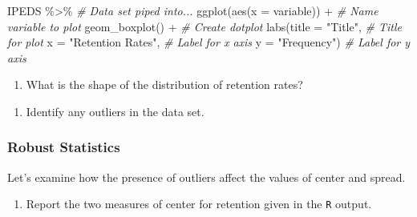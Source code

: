 \documentclass[
]{report}
\newenvironment{Shaded}{\begin{snugshade}}{\end{snugshade}}
\newcommand{\AttributeTok}[1]{\textcolor[rgb]{0.77,0.63,0.00}{#1}}
\newcommand{\CommentTok}[1]{\textcolor[rgb]{0.56,0.35,0.01}{\textit{#1}}}
\newcommand{\FunctionTok}[1]{\textcolor[rgb]{0.00,0.00,0.00}{#1}}
\newcommand{\NormalTok}[1]{#1}
\newcommand{\SpecialCharTok}[1]{\textcolor[rgb]{0.00,0.00,0.00}{#1}}
\newcommand{\StringTok}[1]{\textcolor[rgb]{0.31,0.60,0.02}{#1}}
\providecommand{\tightlist}{%
  \setlength{\itemsep}{0pt}\setlength{\parskip}{0pt}}
\begin{document}
\begin{Shaded}
\begin{Highlighting}[]
\NormalTok{IPEDS }\SpecialCharTok{\%\textgreater{}\%} \CommentTok{\# Data set piped into...}
\FunctionTok{ggplot}\NormalTok{(}\FunctionTok{aes}\NormalTok{(}\AttributeTok{x =}\NormalTok{ variable)) }\SpecialCharTok{+}   \CommentTok{\# Name variable to plot}
  \FunctionTok{geom\_boxplot}\NormalTok{() }\SpecialCharTok{+}  \CommentTok{\# Create dotplot}
  \FunctionTok{labs}\NormalTok{(}\AttributeTok{title =} \StringTok{"Title"}\NormalTok{, }\CommentTok{\# Title for plot}
       \AttributeTok{x =} \StringTok{"Retention Rates"}\NormalTok{, }\CommentTok{\# Label for x axis}
       \AttributeTok{y =} \StringTok{"Frequency"}\NormalTok{) }\CommentTok{\# Label for y axis}
\end{Highlighting}
\end{Shaded}

\begin{enumerate}
\def\labelenumi{\arabic{enumi}.}
\setcounter{enumi}{6}
\tightlist
\item
  What is the shape of the distribution of retention rates?
\end{enumerate}

\vspace{0.3in}

\begin{enumerate}
\def\labelenumi{\arabic{enumi}.}
\setcounter{enumi}{7}
\tightlist
\item
  Identify any outliers in the data set.
\end{enumerate}

\vspace{0.3in}

\hypertarget{robust-statistics}{%
\subsubsection*{Robust Statistics}\label{robust-statistics}}

Let's examine how the presence of outliers affect the values of center and spread.

\begin{enumerate}
\def\labelenumi{\arabic{enumi}.}
\setcounter{enumi}{8}
\tightlist
\item
  Report the two measures of center for retention given in the \texttt{R} output.
\end{enumerate}

\vspace{0.8in}
\end{document}
